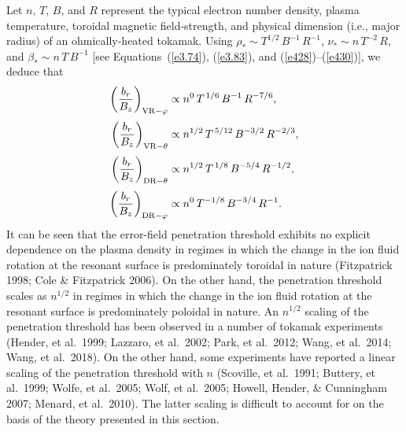 \documentclass[notitlepage,12pt]{article}
\begin{document}
Let $n$, $T$, $B$, and $R$ represent the typical electron number density, plasma temperature, toroidal magnetic field-strength,
and physical dimension (i.e., major radius) of an ohmically-heated tokamak. Using $\rho_\ast\sim T^{1/2}\,B^{-1}\,R^{-1}$, 
$\nu_\ast\sim n\,T^{-2}\,R$, and $\beta_\ast\sim n\,T\,B^{-1}$ [see Equations~(\ref{e3.74}), (\ref{e3.83}), and (\ref{e428})--(\ref{e430})],
we deduce that
\begin{align}
\left(\frac{b_{r}}{B_z}\right)_{{\rm VR}-\varphi} &\propto n^{0}\,T^{\,1/6}\,B^{-1}\,R^{-7/6},\\[0.5ex]
\left(\frac{b_{r}}{B_z}\right)_{{\rm VR}-\theta} &\propto n^{1/2}\,T^{\,5/12}\,B^{-3/2}\,R^{-2/3},\\[0.5ex]
\left(\frac{b_{r}}{B_z}\right)_{{\rm DR}-\theta} &\propto n^{1/2}\,T^{\,1/8}\,B^{-5/4}\,R^{-1/2},\\[0.5ex]
\left(\frac{b_{r}}{B_z}\right)_{{\rm DR}-\varphi} &\propto n^{0}\,T^{-1/8}\,B^{-3/4}\,R^{-1}.
\end{align}
It can be seen that the error-field penetration threshold exhibits no explicit dependence on the plasma
density in regimes in which the change in the ion fluid rotation at the resonant surface is predominately toroidal
in nature (Fitzpatrick 1998; Cole \& Fitzpatrick 2006). On the other hand, the penetration threshold
scales as $n^{1/2}$ in regimes in which the change in the ion fluid rotation at the resonant surface is predominately poloidal 
in nature. An $n^{1/2}$ scaling of the penetration threshold has been observed in a number of tokamak
experiments (Hender, et al.\ 1999; Lazzaro, et al.\ 2002; Park, et al.\ 2012; Wang, et al.\ 2014; Wang, et al.\ 2018). 
On the other hand, some experiments have reported a linear scaling of the penetration threshold with $n$ (Scoville, et al.\ 1991; Buttery, et al.\ 1999; Wolfe, et al.\ 2005; Wolf, et al.\ 2005; Howell, Hender, \& Cunningham 2007; Menard, et al.\ 2010). The latter
scaling is difficult to account for on the basis of the theory presented in this section. 
\end{document}
